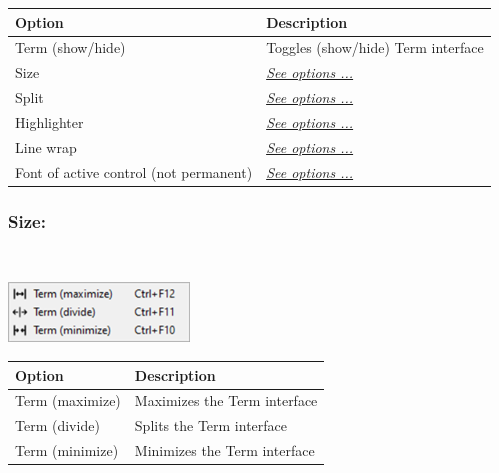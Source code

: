 \begin{scriptsize}
  \begin{tabularx}{\textwidth}{>{\hsize=0.7\hsize}X>{\hsize=0.7\hsize}X}\\
    \hline
    \textbf{Option} & \textbf{Description} \\
    \hline
    Term (show/hide) & Toggles (show/hide) Term interface \\
    \hdashline[1pt/1pt]
    Size & \textit{\href{\#menu\_view\_r\_term\_size}{See options ...}} \\
    Split & \textit{\href{\#menu\_view\_r\_term\_split}{See options ...}} \\
    Highlighter & \textit{\href{\#menu\_view\_r\_term\_highlighter}{See options ...}} \\
    Line wrap & \textit{\href{\#menu\_r\_term\_linewrap}{See options ...}} \\
    \hdashline[1pt/1pt]
    Font of active control (not permanent) & \textit{\href{\#menu\_r\_term\_fontsize}{See options ...}} \\
    \hline
  \end{tabularx}
\end{scriptsize}


\hypertarget{menu_view_r_term_size}{}
\subsubsection{Size:}\\

\includegraphics[scale=0.8]{./res/menu_r_term_size.png}\\

\begin{scriptsize}
  \begin{tabularx}{\textwidth}{>{\hsize=0.3\hsize}X>{\hsize=0.7\hsize}X}\\
    \hline
    \textbf{Option} & \textbf{Description} \\
    \hline
    Term (maximize) & Maximizes the Term interface \\
    Term (divide) & Splits the Term interface \\
    Term (minimize) & Minimizes the Term interface \\
    \hline
  \end{tabularx}
\end{scriptsize}


